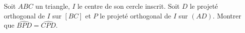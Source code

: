 Soit $ABC$ un triangle, $I$ le centre de son cercle inscrit. Soit $D$ le projeté orthogonal de $I$ sur $[BC]$ et $P$ le projeté orthogonal de $I$ sur $(AD)$. Montrer que $\widehat{BPD} = \widehat{CPD}$.